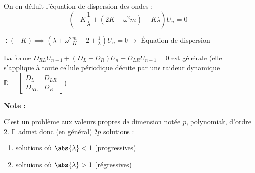\documentclass[12pt,a4paper]{article}
\begin{document}
\begin{sol}
\begin{enumerate}
			On en déduit l'équation de dispersion des ondes : 
			\[
			\left(-K\frac{1}{\lambda} + (2K-\omega^2m)-K\lambda\right)U_n = 0
			\]
			
			\begin{minipage}[t]{15cm}
				$\div(-K) \implies \left(\lambda + \omega^2\frac{m}{K} -2+\frac{1}{\lambda}\right)U_n = 0 \to $ Équation de dispersion
			\end{minipage}
			
			\begin{minipage}[t]{15cm}
				La forme $D_{RL}U_{n-1}+(D_L+D_R)U_n+D_{LR}U_{n+1} = 0$ est générale (elle s'applique à toute cellule périodique décrite par une raideur dynamique $\mathbb{D} = \left[\begin{matrix}
					D_L & D_{LR} \\
					D_{RL} & D_R
				\end{matrix}\right]$)
			\end{minipage}
			
			
			\textbf{Note :} \begin{minipage}[t]{15cm}
				C'est un problème aux valeurs propres de dimension notée $p$, polynomiak, d'ordre 2. Il admet donc (en général) $2p$ solutions :
				\begin{enumerate}
					\item[$p$] solutions où $\abs{\lambda} < 1$ (progressives)
					\item[$p$] soltuions où $\abs{\lambda} > 1$ (régressives)
				\end{enumerate}
			\end{minipage}
		\end{enumerate}
	\end{sol}
	
	\newpage
	
\end{document}
